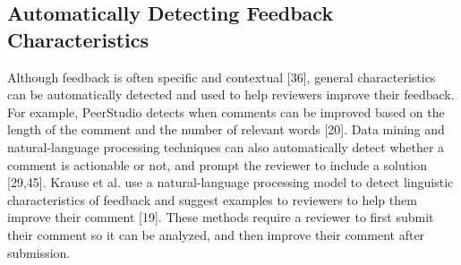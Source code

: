 \subsection{Automatically Detecting Feedback Characteristics}
Although feedback is often specific and contextual [36], general characteristics can be automatically detected and used to help reviewers improve their feedback. For example, PeerStudio detects when comments can be improved based on the length of the comment and the number of relevant words [20]. Data mining and natural-language processing techniques can also automatically detect whether a comment is actionable or not, and prompt the reviewer to include a solution [29,45]. Krause et al. use a natural-language processing model to detect linguistic characteristics of feedback and suggest examples to reviewers to help them improve their comment [19]. These methods require a reviewer to first submit their comment so it can be analyzed, and then improve their comment after submission.
